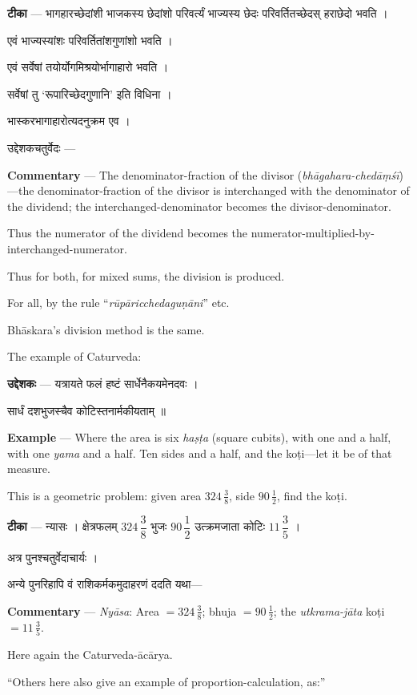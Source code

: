 \documentclass[11pt,a4paper]{article}
\newcommand{\skt}[1]{{\devanagarifont\color{sktcolor} #1}}
\newenvironment{bilingual}{%
  \par\noindent
  \begin{minipage}[t]{0.47\textwidth}%
}{%
  \par\end{minipage}%
}
\newcommand{\rightcol}{%
  \par\end{minipage}%
  \hfill
  \begin{minipage}[t]{0.47\textwidth}%
}
\begin{document}
\medskip

\begin{bilingual}
\textbf{टीका} --- \skt{भागहारच्छेदांशी भाजकस्य छेदांशो परिवर्त्यं भाज्यस्य छेदः परिवर्तितच्छेदस् हराछेदो भवति} ।

\skt{एवं भाज्यस्यांशः परिवर्तितांशगुणांशो भवति} ।

\skt{एवं सर्वेषां तयोर्योगमिश्रयोर्भागाहारो भवति} ।

\skt{सर्वेषां तु `रूपारिच्छेदगुणानि' इति विधिना} ।

\skt{भास्करभागाहारोत्यदनुक्रम एव} ।

\skt{उद्देशकचतुर्वेदः ---}
\rightcol
\textbf{Commentary} --- The denominator-fraction of the divisor (\textit{bhāgahara-chedāṃśī})---the denominator-fraction of the divisor is interchanged with the denominator of the dividend; the interchanged-denominator becomes the divisor-denominator.

Thus the numerator of the dividend becomes the numerator-multiplied-by-interchanged-numerator.

Thus for both, for mixed sums, the division is produced.

For all, by the rule ``\textit{rūpāricchedaguṇāni}'' etc.

Bhāskara's division method is the same.

The example of Caturveda:
\end{bilingual}

\medskip

\begin{bilingual}
\textbf{उद्देशकः} --- \skt{यत्रायते फलं हष्टं सार्धेनैकयमेनदवः} ।

\skt{सार्धं दशभुजस्चैव कोटिस्तनार्मकीयताम्} ॥
\rightcol
\textbf{Example} --- Where the area is six \textit{haṣṭa} (square cubits), with one and a half, with one \textit{yama} and a half. Ten sides and a half, and the koṭi---let it be of that measure.

This is a geometric problem: given area $324\,\frac{3}{8}$, side $90\,\frac{1}{2}$, find the koṭi.
\end{bilingual}

\medskip

\begin{bilingual}
\textbf{टीका} --- \skt{न्यासः । क्षेत्रफलम्} $324\,\dfrac{3}{8}$ \skt{भुजः} $90\,\dfrac{1}{2}$ \skt{उत्क्रमजाता कोटिः} $11\,\dfrac{3}{5}$ ।

अत्र पुनश्चतुर्वेदाचार्यः ।

\skt{अन्ये पुनरिहापि वं राशिकर्मकमुदाहरणं ददति यथा---}
\rightcol
\textbf{Commentary} --- \textit{Nyāsa}: Area $= 324\,\frac{3}{8}$; bhuja $= 90\,\frac{1}{2}$; the \textit{utkrama-jāta} koṭi $= 11\,\frac{3}{5}$.

Here again the Caturveda-ācārya.

``Others here also give an example of proportion-calculation, as:''
\end{bilingual}
\end{document}
